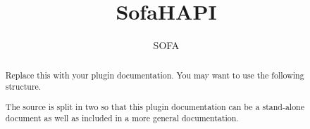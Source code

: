 \documentclass{article}
\begin{document}
\raggedright

\title{SofaHAPI}
\author{SOFA}

\maketitle

\begin{abstract}
Replace this with your plugin documentation. You may want to use the following structure.

The source is split in two so that this plugin documentation can be a stand-alone document as well as included in a more general documentation.
\end{abstract}


\end{document}
